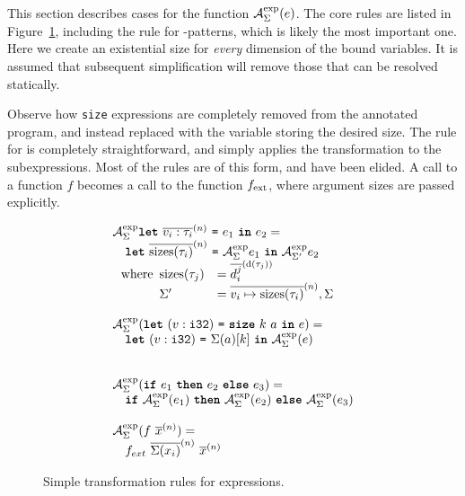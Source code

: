 This section describes cases for the function
\(\mathcal{A}_{\Sigma}^{\text{exp}}(e)\).  The core rules are listed in
Figure~\ref{fig:simple-transformation-rules}, including the rule for
-patterns, which is likely the most important one.  Here we
create an existential size for \textit{every} dimension of the bound
variables.  It is assumed that subsequent simplification will remove
those that can be resolved statically.

Observe how \texttt{size} expressions are completely removed from the
annotated program, and instead replaced with the variable storing the
desired size.  The rule for  is completely straightforward, and
simply applies the transformation to the subexpressions.  Most of the
rules are of this form, and have been elided.  A call to a function
\(f\) becomes a call to the function \(f_{\textrm{ext}}\), where argument
sizes are passed explicitly.

\begin{figure}

\[
\begin{array}{l}
  \mathcal{A}_{\Sigma}^{\text{exp}}{\mbox{\texttt{\bfseries{let}}}~\overline{v_{i}: \tau_{i}}^{(n)}~\mbox{\texttt{=}}~e_{1}~\mbox{\texttt{\bfseries{in}}}~e_{2}} = \\
  \quad \mbox{\texttt{\bfseries{let}}}~\overline{\textrm{sizes}(\tau_{i})}^{(n)}~\mbox{\texttt{=}}~\mathcal{A}_{\Sigma}^{\text{exp}}{e_{1}}~\mbox{\texttt{\bfseries{in}}}~\mathcal{A}_{\Sigma'}^{\text{exp}}{e_{2}} \\
  ~~ \textrm{where}
  \begin{array}[t]{ll}
    \textrm{sizes}(\tau_j) &= \overline{d^{j}_{i}}^{(\textrm{d}(\tau_{j}))} \\
    \Sigma' &=\overline{v_{i}\mapsto\textrm{sizes}(\tau_{i})}^{(n)},\Sigma
  \end{array}
  \\
  \\
\mathcal{A}_{\Sigma}^{\text{exp}}(\mbox{\texttt{\bfseries{let}}}~(v: \texttt{i32})~\mbox{\texttt{=}}~\mbox{\texttt{\bfseries{size}}}~k~a~\mbox{\texttt{\bfseries{in}}}~e) = \\
\quad \mbox{\texttt{\bfseries{let}}}~(v: \texttt{i32})~\mbox{\texttt{=}}~\Sigma(a)[k]~\mbox{\texttt{\bfseries{in}}}~\mathcal{A}_{\Sigma}^{\text{exp}}(e) \\
\\
\\
\mathcal{A}_{\Sigma}^{\text{exp}}(\mbox{\texttt{\bfseries{if}}}~e_{1}~\mbox{\texttt{\bfseries{then}}}~e_{2}~\mbox{\texttt{\bfseries{else}}}~e_{3}) = \\
\quad \mbox{\texttt{\bfseries{if}}}~\mathcal{A}_{\Sigma}^{\text{exp}}(e_{1})~\mbox{\texttt{\bfseries{then}}}~\mathcal{A}_{\Sigma}^{\text{exp}}(e_{2})~\mbox{\texttt{\bfseries{else}}}~\mathcal{A}_{\Sigma}^{\text{exp}}(e_{3})
  \\
  \\
  \mathcal{A}_{\Sigma}^{\text{exp}}(f~\overline{x}^{(n)}) = \\
  \quad f_{ext}~\overline{\Sigma(x_{i})}^{(n)}~\overline{x}^{(n)}
\end{array}
\]

\caption{Simple transformation rules for expressions.}
\label{fig:simple-transformation-rules}
\end{figure}

